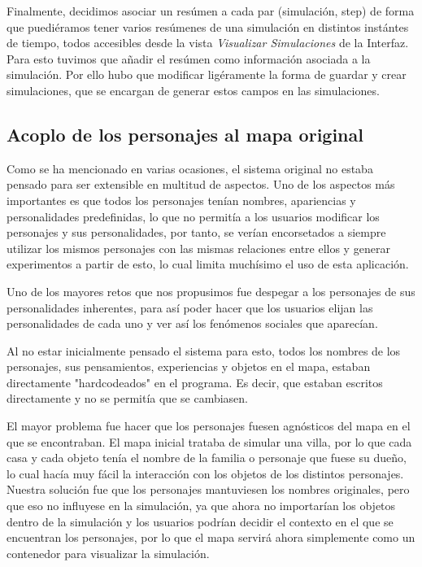 Finalmente, decidimos asociar un resúmen a cada par (simulación, step) de forma que puediéramos tener varios resúmenes de una simulación en distintos instántes de tiempo, todos accesibles desde la vista \textit{Visualizar Simulaciones} de la Interfaz. Para esto tuvimos que añadir el resúmen como información asociada a la simulación. Por ello hubo que modificar ligéramente la forma de guardar y crear simulaciones, que se encargan de generar estos campos en las simulaciones.

\subsection{Acoplo de los personajes al mapa original}
\label{problemaPersonajes}
Como se ha mencionado en varias ocasiones, el sistema original no estaba pensado para ser extensible en multitud de aspectos. Uno de los aspectos más importantes es que todos los personajes tenían nombres, apariencias y personalidades predefinidas, lo que no permitía a los usuarios modificar los personajes y sus personalidades, por tanto, se verían encorsetados a siempre utilizar los mismos personajes con las mismas relaciones entre ellos y generar experimentos a partir de esto, lo cual limita muchísimo el uso de esta aplicación.

Uno de los mayores retos que nos propusimos fue despegar a los personajes de sus personalidades inherentes, para así poder hacer que los usuarios elijan las personalidades de cada uno y ver así los fenómenos sociales que aparecían.

Al no estar inicialmente pensado el sistema para esto, todos los nombres de los personajes, sus pensamientos, experiencias y objetos en el mapa, estaban directamente "hardcodeados" en el programa. Es decir, que estaban escritos directamente y no se permitía que se cambiasen.

El mayor problema fue hacer que los personajes fuesen agnósticos del mapa en el que se encontraban. El mapa inicial trataba de simular una villa, por lo que cada casa y cada objeto tenía el nombre de la familia o personaje que fuese su dueño, lo cual hacía muy fácil la interacción con los objetos de los distintos personajes. Nuestra solución fue que los personajes mantuviesen los nombres originales, pero que eso no influyese en la simulación, ya que ahora no importarían los objetos dentro de la simulación y los usuarios podrían decidir el contexto en el que se encuentran los personajes, por lo que el mapa servirá ahora simplemente como un contenedor para visualizar la simulación.


